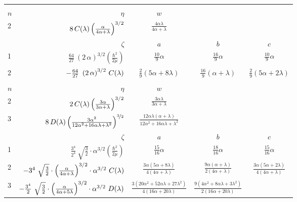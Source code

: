 \documentclass[onecolumn,preprint,superscriptaddress,nofootinbib,notitlepage,10pt,linenumbers]{revtex4-1}
\newcommand{\cc}{\ensuremath C(\lambda)}
\newcommand{\dd}{\ensuremath D(\lambda)}
\newcommand{\aba}{\ensuremath $(ab)\!\!:\!\!(a)$}
\newcommand{\ebce}{\ensuremath $(abc)\wasytherefore(a)$}
\begin{document}
\setlength{\tabcolsep}{4pt}
\renewcommand{\arraystretch}{1.6}
\begin{longtable}{l|rccc}
\multicolumn{5}{c}{\fbox{\aba}}\\
$n$ & $\eta$  & $w$ & &\\
2   & $8\,\cc\left(\frac{\alpha}{4\alpha+\lambda}\right)^{3/2}$ &
      $\frac{4\alpha\lambda}{4\alpha+\lambda}$ & &  \\
\hline
           & $\zeta$ & $a$ & $b$ & $c$ \\           
1   & $\frac{64}{27}~\left(2\,\alpha\right)^{3/2}\left(\frac{\hbar^2}{2\mu}\right)$ & 
      $\frac{10}{9}\alpha$ & 
      $\frac{16}{9}\alpha$ & 
      $\frac{10}{9}\alpha$ \\
2   & $-\frac{64}{27}~\left(2\,\alpha\right)^{3/2}\,\cc$ & 
      $\frac{2}{9}(5\alpha+8\lambda)$ & 
      $\frac{16}{9}(\alpha+\lambda)$  & 
      $\frac{2}{9}(5\alpha+2\lambda)$ \\
\hline\hline
\multicolumn{5}{c}{\fbox{\ebce}}\\
$n$ & $\eta$  & $w$ & &\\
2   & $2\,\cc\left(\frac{3\alpha}{3\alpha+\lambda}\right)^{3/2}$ & 
      $\frac{3\alpha\lambda}{3\alpha+\lambda}$ &  &  \\
3   & $8\,\dd\left(\frac{3\alpha^2}{12\alpha^2+16\alpha\lambda+\lambda^2}\right)^{\nicefrac{3}{2}}$ & 
      $\frac{12\alpha\lambda(\alpha+\lambda)}{12\alpha^2+16\alpha\lambda+\lambda^2}$ &  &  \\
\hline
           & $\zeta$ & $a$ & $b$ & $c$ \\
1   & $\frac{3^4}{2^4}~\sqrt{\frac{3}{2}}\cdot\alpha^{3/2}\left(\frac{\hbar^2}{2\mu}\right)$ & $\frac{15}{16}\alpha$ & 
      $\frac{18}{16}\alpha$ & 
      $\frac{15}{16}\alpha$ \\
2   & $-3^4~\sqrt{\frac{3}{2}}\cdot\left(\frac{\alpha}{4\alpha+\lambda}\right)^{3/2}\cdot\alpha^{3/2}~\cc$ & 
      $\frac{3\alpha(5\alpha+8\lambda)}{4(4\alpha+\lambda)}$ & 
      $\frac{9\alpha(\alpha+\lambda)}{2(4\alpha+\lambda)}$ & 
      $\frac{3\alpha(5\alpha+2\lambda)}{4(4\alpha+\lambda)}$ \\
3   & $-\frac{3^4}{2}~\sqrt{\frac{3}{2}}\cdot\left(\frac{\alpha}{4\alpha+5\lambda}\right)^{3/2}\cdot\alpha^{3/2}~\dd$ & 
      $\frac{3(20\alpha^2+52\alpha\lambda+27\lambda^2)}{4(16\alpha+20\lambda)}$ & 
      $\frac{9(4\alpha^2+8\alpha\lambda+3\lambda^2)}{2(16\alpha+20\lambda)}$ &

\end{longtable}
\end{document}
